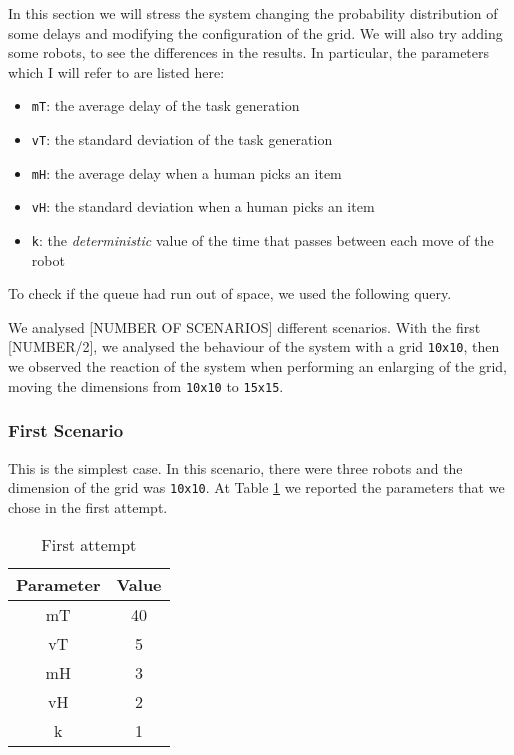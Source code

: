 In this section we will stress the system changing the probability distribution of some delays and modifying the configuration of the grid. We will also try adding some robots, to see the differences in the results. In particular, the parameters which I will refer to are listed here:
\begin{itemize}
    \item \texttt{mT}: the average delay of the task generation
    \item \texttt{vT}: the standard deviation of the task generation
    \item \texttt{mH}: the average delay when a human picks an item
    \item \texttt{vH}: the standard deviation when a human picks an item
    \item \texttt{k}: the \emph{deterministic} value of the time that passes between each move of the robot
\end{itemize}

To check if the queue had run out of space, we used the following query. \query

We analysed [NUMBER OF SCENARIOS] different scenarios. With the first [NUMBER/2], we analysed the behaviour of the system with a grid \texttt{10x10}, then we observed the reaction of the system when performing an enlarging of the grid, moving the dimensions from \texttt{10x10} to \texttt{15x15}.

\subsubsection{First Scenario}
This is the simplest case. In this scenario, there were three robots and the dimension of the grid was \texttt{10x10}. At Table \ref{tab:firstattempt} we reported the parameters that we chose in the first attempt.

\begin{table}[h]
\centering
    \begin{tabular}{|c c|} 
        \hline
        Parameter & Value \\ [0.5ex] 
        \hline\hline
        mT & 40 \\
        vT & 5 \\
        mH & 3 \\
        vH & 2 \\
        k & 1 \\ [0.5ex] 
        \hline
    \end{tabular}
    \caption{First attempt}
    \label{tab:firstattempt}
\end{table}

